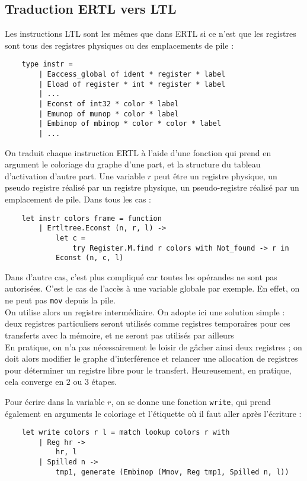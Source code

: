 \documentclass{cours}
\begin{document}
\subsection{Traduction ERTL vers LTL}
Les instructions LTL sont les mêmes que dans ERTL si ce n'est que les registres sont tous des registres physiques ou des emplacements de pile :
\begin{verbatim}
    type instr =
        | Eaccess_global of ident * register * label
        | Eload of register * int * register * label
        | ...
        | Econst of int32 * color * label
        | Emunop of munop * color * label
        | Embinop of mbinop * color * color * label
        | ...
\end{verbatim}
On traduit chaque instruction ERTL à l'aide d'une fonction qui prend en argument le coloriage du graphe d'une part, et la structure du tableau d'activation d'autre part.
Une variable $r$ peut être un registre physique, un pseudo registre réalisé par un registre physique, un pseudo-registre réalisé par un emplacement de pile. Dans tous les cas :
\begin{verbatim}
    let instr colors frame = function
        | Ertltree.Econst (n, r, l) ->
            let c =
                try Register.M.find r colors with Not_found -> r in
            Econst (n, c, l)
\end{verbatim}
Dans d'autre cas, c'est plus compliqué car toutes les opérandes ne sont pas autorisées. C'est le cas de l'accès à une variable globale par exemple. En effet, on ne peut pas \texttt{mov} depuis la pile.\\
On utilise alors un registre intermédiaire. On adopte ici une solution simple : deux registres particuliers seront utilisés comme registres temporaires pour ces transferts avec la mémoire, et ne seront pas utilisés par ailleurs\\
En pratique, on n'a pas nécessairement le loisir de gâcher ainsi deux registres ; on doit alors modifier le graphe d'interférence et relancer une allocation de registres pour déterminer un registre libre pour le transfert. Heureusement, en pratique, cela converge en $2$ ou $3$ étapes.

Pour écrire dans la variable $r$, on se donne une fonction \texttt{write}, qui prend également en arguments le coloriage et l'étiquette où il faut aller après l'écriture :
\begin{verbatim}
    let write colors r l = match lookup colors r with
        | Reg hr ->
            hr, l
        | Spilled n ->
            tmp1, generate (Embinop (Mmov, Reg tmp1, Spilled n, l))
\end{verbatim}
\end{document}
